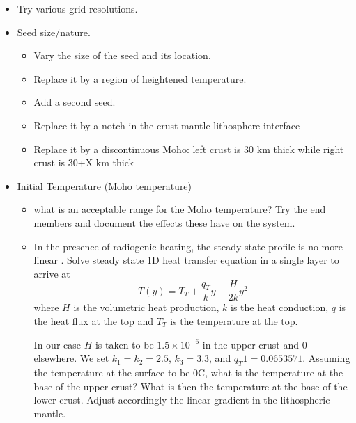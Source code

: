 \documentclass[a4paper]{article}
\begin{document}
\begin{itemize}
\item Try various grid resolutions. 
\item Seed size/nature. 
   \begin{itemize}
   \item Vary the size of the seed and its location. 
   \item Replace it by a region of heightened temperature. 
   \item Add a second seed.
   \item Replace it by a notch in the crust-mantle lithosphere interface
   \item Replace it by a discontinuous Moho: left crust is 30 km thick while right crust is 30+X km thick
   \end{itemize}

\item Initial Temperature (Moho temperature)
   \begin{itemize}
   \item what is an acceptable range for the Moho temperature? Try the end members and document the effects these have on the system.
   \item In the presence of radiogenic heating, the steady state profile is no more linear \cite{chap86}.
   Solve steady state 1D heat transfer equation in a single layer to arrive at 
   \[
   T(y) = T_T + \frac{q_T}{k} y - \frac{H}{2k}y^2
   \]
   where $H$ is the volumetric heat production, $k$ is the heat conduction, $q$ is the heat flux at the top and 
   $T_T$ is the temperature at the top.

   In our case $H$ is taken to be $1.5\times10^{-6}$ in the upper crust and 0 elsewhere. We set $k_1=k_2=2.5$, $k_3=3.3$, and $q_T1=0.0653571$. 
   Assuming the temperature at the surface to be 0C, what is the temperature at the base of the upper crust?
   What is then the temperature at the base of the lower crust. Adjust accordingly the linear gradient in the lithospheric mantle.


\end{itemize}


\end{itemize}
\end{document}
